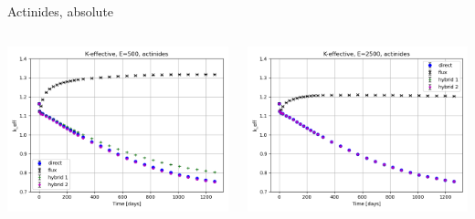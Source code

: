 \documentclass[
	11pt, %
	aspectratio=169, %
]{beamer}
\begin{document}
\begin{frame}{Actinides, absolute}
\begin{columns}[c]
\begin{column}{0.39\textwidth}
			\includegraphics[width=\textwidth]{../figures/keff/keff_actinides_500.png}
		\end{column}
		\begin{column}{0.39\textwidth}
			\includegraphics[width=\textwidth]{../figures/keff/keff_actinides_2500.png}


\end{column}
\end{columns}
\end{frame}
\end{document}
